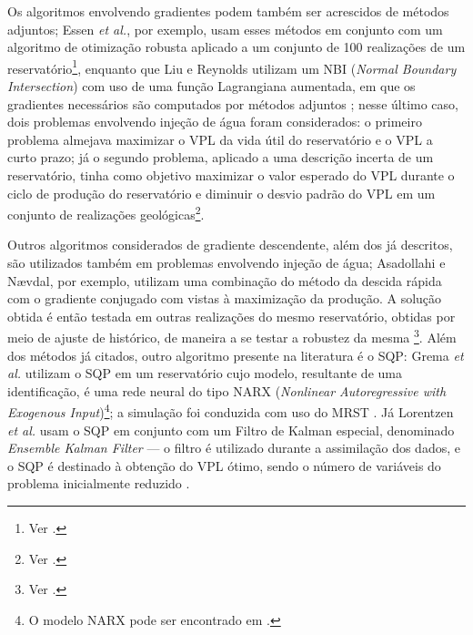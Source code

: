 Os algoritmos envolvendo gradientes podem tamb\'{e}m ser acrescidos de m\'{e}todos adjuntos; Essen \textit{et al.}, por exemplo, usam esses m\'{e}todos em conjunto com um algoritmo de otimiza\c{c}\~{a}o robusta aplicado a um conjunto de 100 realiza\c{c}\~{o}es de um reservat\'{o}rio\footnote{Ver \cite{SPE:RWO}.}, enquanto que Liu e Reynolds utilizam um NBI (\textit{Normal Boundary Intersection}) com uso de uma fun\c{c}\~{a}o Lagrangiana aumentada, em que os gradientes necess\'{a}rios s\~{a}o computados por m\'{e}todos adjuntos \cite{GEO:LIU}; nesse \'{u}ltimo caso, dois problemas envolvendo inje\c{c}\~{a}o de \'{a}gua foram considerados: o primeiro problema almejava maximizar o VPL da vida \'{u}til do reservat\'{o}rio e o VPL a curto prazo; j\'{a} o segundo problema, aplicado a uma descri\c{c}\~{a}o incerta de um reservat\'{o}rio, tinha como objetivo maximizar o valor esperado do VPL durante o ciclo de produ\c{c}\~{a}o do reservat\'{o}rio e diminuir o desvio padr\~{a}o do VPL em um conjunto de realiza\c{c}\~{o}es geol\'{o}gicas\footnote{Ver \cite{GEO:LIU}.}.

Outros algoritmos considerados de gradiente descendente, al\'{e}m dos j\'{a} descritos, s\~{a}o utilizados tamb\'{e}m em problemas envolvendo inje\c{c}\~{a}o de \'{a}gua; Asadollahi e N{\ae}vdal, por exemplo, utilizam uma combina\c{c}\~{a}o do m\'{e}todo da descida r\'{a}pida com o gradiente conjugado com vistas \`{a} maximiza\c{c}\~{a}o da produ\c{c}\~{a}o. A solu\c{c}\~{a}o obtida \'{e} ent\~{a}o testada em outras realiza\c{c}\~{o}es do mesmo reservat\'{o}rio, obtidas por meio de ajuste de hist\'{o}rico, de maneira a se testar a robustez da mesma \footnote{Ver \cite{SPE:WFO}.}. Al\'{e}m dos m\'{e}todos j\'{a} citados, outro algoritmo presente na literatura \'{e} o SQP: Grema \textit{et al.} utilizam o SQP em um reservat\'{o}rio cujo modelo, resultante de uma identifica\c{c}\~{a}o, \'{e} uma rede neural do tipo NARX (\textit{Nonlinear Autoregressive with Exogenous Input})\footnote{O modelo NARX pode ser encontrado em \cite[p. 390]{aguirre}.}; a simula\c{c}\~{a}o foi conduzida com uso do MRST \cite{grema2017optimization}. J\'{a} Lorentzen \textit{et al.} usam o SQP em conjunto com um Filtro de Kalman especial, denominado \textit{Ensemble Kalman Filter} --- o filtro \'{e} utilizado durante a assimila\c{c}\~{a}o dos dados, e o SQP \'{e} destinado \`{a} obten\c{c}\~{a}o do VPL \'{o}timo, sendo o n\'{u}mero de vari\'{a}veis do problema inicialmente reduzido \cite{lorentzen2009sqp}.

